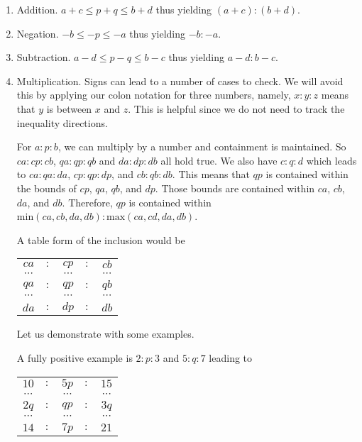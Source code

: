 \documentclass[12pt]{article}
\begin{document}
\begin{enumerate}
    \item Addition.   $a +c \leq  p + q \leq  b +d$ thus yielding $(a+c):(b+d)$.
    \item Negation.  $-b \leq -p \leq -a$ thus yielding $-b:-a$.
    \item Subtraction.  $a - d \leq p-q \leq b -c$  thus yielding $a-d:b-c$.
    \item Multiplication. Signs can lead to a number of cases to check. We will avoid this by  applying our colon notation for three numbers, namely,  $x:y:z$ means that $y$ is between $x$ and $z$. This is helpful since we do not need to track the inequality directions. 
    
    For $a:p:b$, we can multiply by a number and containment is maintained. So $ca:cp:cb$, $qa: qp: qb$ and $da:dp:db$ all hold true. We also have $c:q:d$ which leads to $ca:qa:da$, $cp:qp:dp$, and $cb:qb:db$. This means that $qp$ is contained within the bounds of $cp$, $qa$, $qb$, and $dp$. Those bounds are contained within $ca$, $cb$, $da$, and $db$. Therefore, $qp$ is contained within $\mathrm{min}(ca, cb, da, db):\mathrm{max}(ca, cd, da, db)$. 
    
    A table form of the inclusion would be 
    
    \begin{tabular}{ccccc}
        $ca$ &$:$& $cp$ &$:$& $cb$ \\
        $\cdots$ & & $\cdots$ & & $\cdots$ \\
        $qa$ &$:$& $qp$ &$:$& $qb$\\
        $\cdots$ & & $\cdots$ & & $\cdots$ \\
         $da$ &$:$& $dp$&$:$& $db$
    \end{tabular}
    
    Let us demonstrate with some examples. 
    
    A fully positive example is $2:p:3$ and $5:q:7$ leading to 
    
     \begin{tabular}{ccccc}
        $10$ &$:$& $5p$ &$:$& $15$ \\
        $\cdots$ & & $\cdots$ & & $\cdots$ \\
        $2q$ &$:$& $qp$ &$:$& $3q$\\
        $\cdots$ & & $\cdots$ & & $\cdots$ \\
         $14$ &$:$& $7p$&$:$& $21$
    \end{tabular}
    

\end{enumerate}
\end{document}
